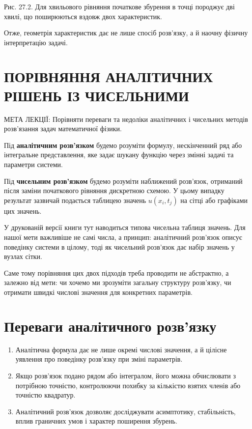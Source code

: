 \documentclass[
  ukrainian,
]{article}
\providecommand{\tightlist}{%
  \setlength{\itemsep}{0pt}\setlength{\parskip}{0pt}}
\begin{document}
Рис. 27.2. Для хвильового рівняння початкове збурення в точці породжує
дві хвилі, що поширюються вздовж двох характеристик.

Отже, геометрія характеристик дає не лише спосіб розв'язку, а й наочну
фізичну інтерпретацію задачі.

\section{ПОРІВНЯННЯ АНАЛІТИЧНИХ РІШЕНЬ ІЗ
ЧИСЕЛЬНИМИ}\label{ux43fux43eux440ux456ux432ux43dux44fux43dux43dux44f-ux430ux43dux430ux43bux456ux442ux438ux447ux43dux438ux445-ux440ux456ux448ux435ux43dux44c-ux456ux437-ux447ux438ux441ux435ux43bux44cux43dux438ux43cux438}

МЕТА ЛЕКЦІЇ: Порівняти переваги та недоліки аналітичних і чисельних
методів розв'язання задач математичної фізики.

Під \textbf{аналітичним розв'язком} будемо розуміти формулу,
нескінченний ряд або інтегральне представлення, яке задає шукану функцію
через змінні задачі та параметри системи.

Під \textbf{чисельним розв'язком} будемо розуміти наближений розв'язок,
отриманий після заміни початкового рівняння дискретною схемою. У цьому
випадку результат зазвичай подається таблицею значень \(u(x_i,t_j)\) на
сітці або графіками цих значень.

У друкованій версії книги тут наводиться типова чисельна таблиця
значень. Для нашої мети важливіше не самі числа, а принцип: аналітичний
розв'язок описує поведінку системи в цілому, тоді як чисельний розв'язок
дає набір значень у вузлах сітки.

Саме тому порівняння цих двох підходів треба проводити не абстрактно, а
залежно від мети: чи хочемо ми зрозуміти загальну структуру розв'язку,
чи отримати швидкі числові значення для конкретних параметрів.

\section{Переваги аналітичного
розв'язку}\label{ux43fux435ux440ux435ux432ux430ux433ux438-ux430ux43dux430ux43bux456ux442ux438ux447ux43dux43eux433ux43e-ux440ux43eux437ux432ux44fux437ux43aux443}

\begin{enumerate}
\def\labelenumi{\arabic{enumi}.}
\tightlist
\item
  Аналітична формула дає не лише окремі числові значення, а й цілісне
  уявлення про поведінку розв'язку при зміні параметрів.
\item
  Якщо розв'язок подано рядом або інтегралом, його можна обчислювати з
  потрібною точністю, контролюючи похибку за кількістю взятих членів або
  точністю квадратур.
\item
  Аналітичний розв'язок дозволяє досліджувати асимптотику, стабільність,
  вплив граничних умов і характер поширення збурень.
\end{enumerate}
\end{document}
